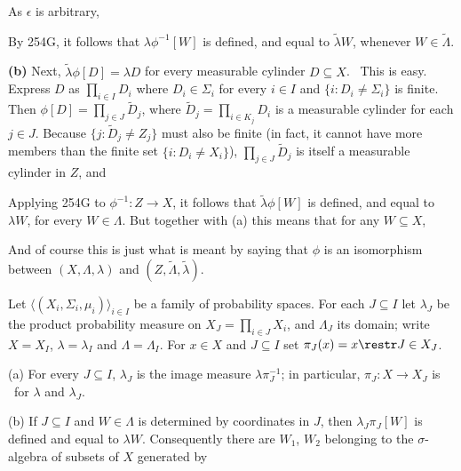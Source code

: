 {\noindent As $\epsilon$ is arbitrary,


By 254G, it follows that $\lambda\phi^{-1}[W]$ is defined, and equal to
$\tilde\lambda W$, whenever $W\in\tilde\Lambda$.
\medskip

{\bf (b)} Next, $\tilde\lambda\phi[D]=\lambda D$ for every measurable
cylinder $D\subseteq X$.   \Prf\ This is easy.   Express $D$ as
$\prod_{i\in I}D_i$ where $D_i\in\Sigma_i$ for every $i\in I$ and
$\{i:D_i\ne\Sigma_i\}$ is finite.   Then $\phi[D]=\prod_{j\in J}\tilde
D_j$, where $\tilde D_j=\prod_{i\in K_j}D_i$ is a measurable cylinder
for each $j\in J$.   Because $\{j:\tilde D_j\ne Z_j\}$ must also be
finite (in fact, it cannot have more members than the finite set
$\{i:D_i\ne X_i\}$), $\prod_{j\in J}\tilde D_j$ is itself a measurable
cylinder in $Z$, and


Applying 254G to $\phi^{-1}:Z\to X$, it follows that
$\tilde\lambda\phi[W]$ is defined, and equal to $\lambda W$, for every
$W\in\Lambda$.   But together with (a) this means that
for any $W\subseteq X$,



\noindent And of course this is just what is meant by saying that $\phi$
is an isomorphism between $(X,\Lambda,\lambda)$ and
$(Z,\tilde\Lambda,\tilde\lambda)$.
}%

 Let
$\langle(X_i,\Sigma_i,\mu_i)\rangle_{i\in I}$ be a family of probability
spaces.   For each $J\subseteq I$ let
$\lambda_J$ be the product probability measure on
$X_J=\prod_{i\in J}X_i$, and $\Lambda_J$ its domain;  write $X=X_I$,
$\lambda=\lambda_I$ and $\Lambda=\Lambda_I$.   For $x\in X$ and
$J\subseteq I$ set $\pi_J(x)=x\restr J\in X_J$.

(a) For every $J\subseteq I$, $\lambda_J$ is the image measure
$\lambda\pi_J^{-1}$;  in particular,
$\pi_J:X\to X_J$ is \imp\ for $\lambda$
and $\lambda_J$.

(b) If $J\subseteq I$ and $W\in\Lambda$ is
determined by coordinates in $J$, then
$\lambda_J\pi_J[W]$ is defined and equal to $\lambda W$.   Consequently
there are $W_1$, $W_2$ belonging to the $\sigma$-algebra of subsets of
$X$ generated by

